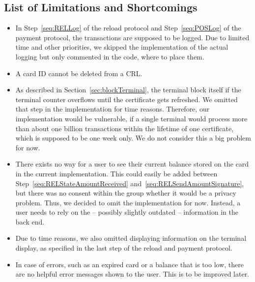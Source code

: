 \documentclass{article}
\begin{document}
    \subsection{List of Limitations and Shortcomings}
    \begin{itemize}
        \item In Step~\ref{seq:RELLog} of the reload protocol and Step~\ref{seq:POSLog} of the payment protocol, the transactions are supposed to be logged.
        Due to limited time and other priorities, we skipped the implementation of the actual logging but only commented in the code, where to place them.
        \item A card ID cannot be deleted from a CRL\@.
        \item As described in Section~\ref{sec:blockTerminal}, the terminal block itself if the terminal counter overflows until the certificate gets refreshed.
        We omitted that step in the implementation for time reasons.
        Therefore, our implementation would be vulnerable, if a single terminal would process more than about one billion transactions within the lifetime of one certificate, which is supposed to be one week only.
        We do not consider this a big problem for now.
        \item There exists no way for a user to see their current balance stored on the card in the current implementation.
        This could easily be added between Step~\ref{seq:RELStateAmountReceived} and~\ref{seq:RELSendAmountSignature}, but there was no consent within the group whether it would be a privacy problem.
        Thus, we decided to omit the implementation for now.
        Instead, a user needs to rely on the -- possibly slightly outdated -- information in the back end.
        \item Due to time reasons, we also omitted displaying information on the terminal display, as specified in the last step of the reload and payment protocol.
        \item In case of errors, such as an expired card or a balance that is too low, there are no helpful error messages shown to the user.
        This is to be improved later.
    \end{itemize}
\end{document}
